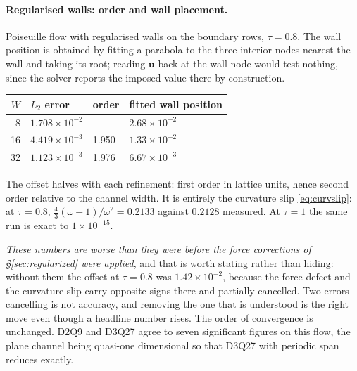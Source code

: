 \documentclass[11pt,a4paper]{article}
\newcommand{\uu}{\bm{u}}
\newcommand{\e}[1]{\times 10^{#1}}
\begin{document}
\paragraph{Regularised walls: order and wall placement.} Poiseuille flow with
regularised walls on the boundary rows, $\tau=0.8$. The wall position is obtained
by fitting a parabola to the three interior nodes nearest the wall and taking its
root; reading $\uu$ back at the wall node would test nothing, since the solver
reports the imposed value there by construction.
\begin{center}\small
\begin{tabular}{rlll}
\toprule
$W$ & $L_2$ error & order & fitted wall position \\
\midrule
8  & $1.708\e{-2}$ & ---   & $2.68\e{-2}$ \\
16 & $4.419\e{-3}$ & 1.950 & $1.33\e{-2}$ \\
32 & $1.123\e{-3}$ & 1.976 & $6.67\e{-3}$ \\
\bottomrule
\end{tabular}
\end{center}
\noindent The offset halves with each refinement: first order in lattice units,
hence second order relative to the channel width. It is entirely the curvature
slip \eqref{eq:curvslip}: at $\tau=0.8$, $\frac43(\omega-1)/\omega^2 = 0.2133$
against $0.2128$ measured. At $\tau=1$ the same run is exact to $1\e{-15}$.

\emph{These numbers are worse than they were before the force corrections of
\S\ref{sec:regularized} were applied}, and that is worth stating rather than
hiding: without them the offset at $\tau=0.8$ was $1.42\e{-2}$, because the
force defect and the curvature slip carry opposite signs there and partially
cancelled. Two errors cancelling is not accuracy, and removing the one that is
understood is the right move even though a headline number rises. The order of
convergence is unchanged. D2Q9 and D3Q27 agree to
seven significant figures on this flow, the plane channel being quasi-one
dimensional so that D3Q27 with periodic span reduces exactly.
\end{document}
